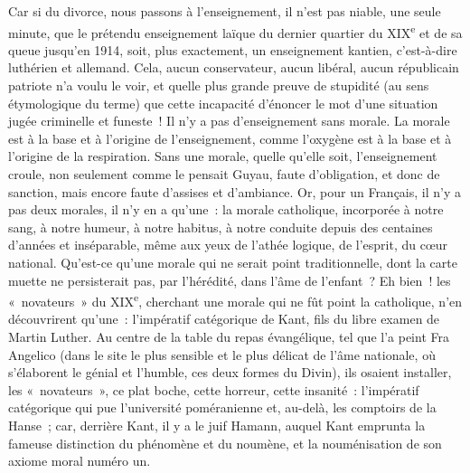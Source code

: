 \documentclass[french,twoside]{book} %
\begin{document}
Car si du divorce, nous passons à l’enseignement, il n’est pas niable, une seule minute, que le prétendu enseignement laïque du dernier quartier du XIX\textsuperscript{e} et de sa queue jusqu’en 1914, soit, plus exactement, un enseignement kantien, c’est-à-dire luthérien et allemand. Cela, aucun conservateur, aucun libéral, aucun républicain patriote n’a voulu le voir, et quelle plus grande preuve de stupidité (au sens étymologique du terme) que cette incapacité d’énoncer le mot d’une situation jugée criminelle et funeste ! Il n’y a pas d’enseignement sans morale. La morale est à la base et à l’origine de l’enseignement, comme l’oxygène est à la base et à l’origine de la respiration. Sans une morale, quelle qu’elle soit, l’enseignement croule, non seulement comme le pensait Guyau, faute d’obligation, et donc de sanction, mais encore faute d’assises et d’ambiance. Or, pour un Français, il n’y a pas deux morales, il n’y en a qu’une : la morale catholique, incorporée à notre sang, à notre humeur, à notre habitus, à notre conduite depuis des centaines d’années et inséparable, même aux yeux de l’athée logique, de l’esprit, du cœur national. Qu’est-ce qu’une morale qui ne serait point traditionnelle, dont la carte muette ne persisterait pas, par l’hérédité, dans l’âme de l’enfant ? Eh bien ! les « novateurs » du XIX\textsuperscript{e}, cherchant une morale qui ne fût point la catholique, n’en découvrirent qu’une : l’impératif catégorique de Kant, fils du libre examen de Martin Luther. Au centre de la table du repas évangélique, tel que l’a peint Fra Angelico (dans le site le plus sensible et le plus délicat de l’âme nationale, où s’élaborent le génial et l’humble, ces deux formes du Divin), ils osaient installer, les « novateurs », ce plat boche, cette horreur, cette insanité : l’impératif catégorique qui pue l’université poméranienne et, au-delà, les comptoirs de la Hanse ; car, derrière Kant, il y a le juif Hamann, auquel Kant emprunta la fameuse distinction du phénomène et du noumène, et la nouménisation de son axiome moral numéro un.\par
\end{document}
